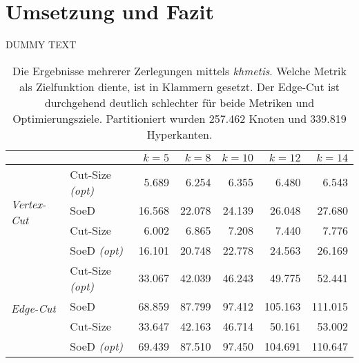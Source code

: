 	\section{Umsetzung und Fazit}
	\label{sec-6}
	DUMMY TEXT

	\begin{table}[htb]
		\centering
		\begin{tabular}{l l|r r r r r}
			 & & $k=5$ & $k=8$ & $k=10$ & $k=12$ & $k=14$\\
			\hline
			\multirow{4}{*}{\textit{Vertex-Cut}}			
			 & Cut-Size \textit{(opt)}& 5.689 & 6.254 & 6.355 & 6.480 & 6.543\\ 
			 & SoeD & 16.568 & 22.078 & 24.139 & 26.048 & 27.680\\ \cline{2-7}
			 & Cut-Size & 6.002 & 6.865 & 7.208 & 7.440 &7.776\\
			 & SoeD \textit{(opt)}& 16.101 & 20.748 & 22.778 & 24.563 & 26.169\\
		   \hline
		   \multirow{4}{*}{\textit{Edge-Cut}}
			& Cut-Size \textit{(opt)}& 33.067 & 42.039 & 46.243 & 49.775 & 52.441 \\
			& SoeD & 68.859 & 87.799 & 97.412 & 105.163 & 111.015\\ \cline{2-7}
			& Cut-Size & 33.647 & 42.163 & 46.714 & 50.161 & 53.002\\
			& SoeD \textit{(opt)}& 69.439 & 87.510 & 97.450 & 104.691 & 110.647\\
		\end{tabular}
	\caption{\label{tab:partition-stats} Die Ergebnisse mehrerer Zerlegungen mittels \textit{khmetis}. Welche Metrik als Zielfunktion diente, ist in Klammern gesetzt. Der Edge-Cut ist durchgehend deutlich schlechter für beide Metriken und Optimierungsziele. Partitioniert wurden 257.462 Knoten und 339.819 Hyperkanten.}
	\end{table}

	
	
	
	
	
	
	
	
	
	
	
	
	
	
	
	
	
	
	
	
	